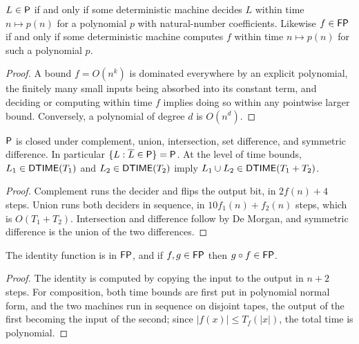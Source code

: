 \begin{lemma}
  \label{lem:polytime-normal-form}
  \leanok
  $L \in \mathsf{P}$ if and only if some deterministic machine decides $L$ within
  time $n \mapsto p(n)$ for a polynomial $p$ with natural-number coefficients.
  Likewise $f \in \mathsf{FP}$ if and only if some deterministic machine computes
  $f$ within time $n \mapsto p(n)$ for such a polynomial $p$.
\end{lemma}
\begin{proof}
  \leanok
  A bound $f = O(n^k)$ is dominated everywhere by an explicit polynomial, the
  finitely many small inputs being absorbed into its constant term, and
  deciding or computing within time $f$ implies doing so within any pointwise
  larger bound. Conversely, a polynomial of degree $d$ is $O(n^d)$.
\end{proof}

\begin{proposition}
  \label{prop:polytime-P-boolean}
  \leanok
  $\mathsf{P}$ is closed under complement, union, intersection, set difference,
  and symmetric difference. In particular $\{L : \overline{L} \in \mathsf{P}\} =
  \mathsf{P}$. At the level of time bounds, $L_1 \in \mathsf{DTIME}(T_1)$ and
  $L_2 \in \mathsf{DTIME}(T_2)$ imply
  $L_1 \cup L_2 \in \mathsf{DTIME}(T_1 + T_2)$.
\end{proposition}
\begin{proof}
  \leanok
  Complement runs the decider and flips the output bit, in $2f(n) + 4$ steps.
  Union runs both deciders in sequence, in $10 f_1(n) + f_2(n)$ steps, which is
  $O(T_1 + T_2)$. Intersection and difference follow by De Morgan, and
  symmetric difference is the union of the two differences.
\end{proof}

\begin{lemma}
  \label{lem:polytime-FP-comp}
  \leanok
  The identity function is in $\mathsf{FP}$, and if $f, g \in \mathsf{FP}$ then
  $g \circ f \in \mathsf{FP}$.
\end{lemma}
\begin{proof}
  \leanok
  The identity is computed by copying the input to the output in $n + 2$
  steps. For composition, both time bounds are first put in polynomial normal
  form, and the two machines run in sequence on disjoint tapes, the output of
  the first becoming the input of the second; since $|f(x)| \le T_f(|x|)$, the
  total time is polynomial.
\end{proof}

